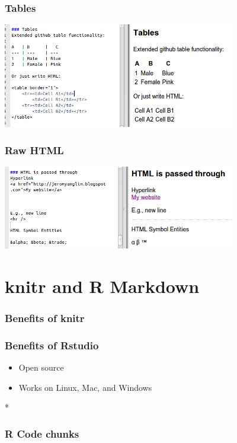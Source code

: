 \begin{frame}\frametitle{Tables}

\includegraphics[width=4in]{figures/tables.png}

\end{frame}

\begin{frame}\frametitle{Raw HTML}

\includegraphics[width=4in]{figures/html.png}

\end{frame}

\section{knitr and R Markdown}

\begin{frame}\frametitle{Benefits of knitr}

\end{frame}

\begin{frame}\frametitle{Benefits of Rstudio}

\begin{itemize}
\item
  Open source
\item
  Works on Linux, Mac, and Windows
\end{itemize}

*

\end{frame}

\begin{frame}\frametitle{R Code chunks}

\end{frame}

